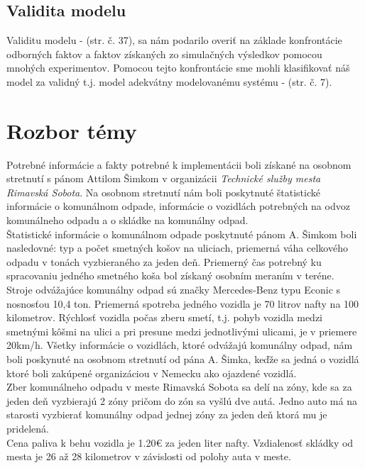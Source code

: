 \documentclass[11pt,a4paper]{article}
\begin{document}
    \subsection{Validita modelu}

        \indent Validitu modelu - \cite{IMS}(str. č. 37), sa nám podarilo overiť na základe konfrontácie odborných faktov a faktov získaných zo simulačných výsledkov pomocou mnohých experimentov. Pomocou tejto konfrontácie sme mohli klasifikovať náš model za validný t.j. model adekvátny modelovanému systému - \cite{IMS}(str. č. 7).

\section{Rozbor témy}

    \indent Potrebné informácie a fakty potrebné k implementácii boli získané na osobnom stretnutí s pánom Attilom Šimkom v organizácii \textit{Technické služby mesta Rimavská Sobota}\cite{TSMRS}. Na osobnom stretnutí nám boli poskytnuté štatistické informácie o komunálnom odpade, informácie o vozidlách potrebných na odvoz komunálneho odpadu a o skládke na komunálny odpad.\\[0.4em]
    \indent Štatistické informácie o komunálnom odpade poskytnuté pánom A. Šimkom boli nasledovné: typ a počet smetných košov na uliciach, priemerná váha celkového odpadu v tonách vyzbieraného za jeden deň. Priemerný čas potrebný ku spracovaniu jedného smetného koša bol získaný osobním meraním v teréne.\\[0.4em]
    \indent Stroje odvážajúce komunálny odpad sú značky Mercedes-Benz typu Econic s nosnosťou 10,4 ton. Priemerná spotreba jedného vozidla je 70 litrov nafty na 100 kilometrov. Rýchlosť vozidla počas zberu smetí, t.j. pohyb vozidla medzi smetnými kôšmi na ulici a pri presune medzi jednotlivými ulicami, je v priemere 20km/h. Všetky informácie o vozidlách, ktoré odvážajú komunálny odpad, nám boli poskynuté na osobnom stretnutí od pána A. Šimka, keďže sa jedná o vozidlá ktoré boli zakúpené organizáciou v Nemecku ako ojazdené vozidlá.\\[0.4em]
    \indent Zber komunálneho odpadu v meste Rimavská Sobota sa delí na zóny\cite{ZONA}, kde sa za jeden deň vyzbierajú 2 zóny pričom do zón sa vyšlú dve autá. Jedno auto má na starosti vyzbierať komunálny odpad jednej zóny za jeden deň ktorá mu je pridelená.\\[0.4em]
    \indent Cena paliva k behu vozidla je 1.20\euro{} za jeden liter nafty\cite{NAFTA}. Vzdialenosť skládky od mesta je 26 až 28 kilometrov v závislosti od polohy auta v meste\cite{VZDIALENOST}.
\end{document}
